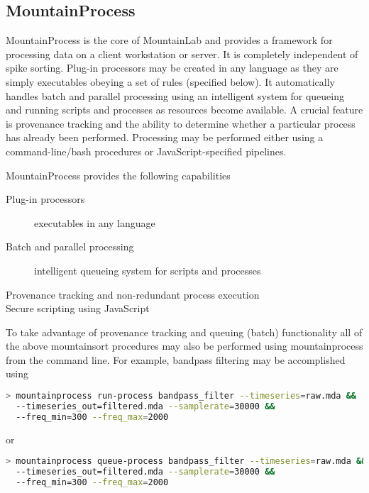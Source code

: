 \documentclass{article}
\begin{document}
\subsection{MountainProcess}

MountainProcess is the core of MountainLab and provides a framework for processing data on a client workstation or server. It is completely independent of spike sorting. Plug-in processors may be created in any language as they are simply executables obeying a set of rules (specified below). It automatically handles batch and parallel processing using an intelligent system for queueing and running scripts and processes as resources become available. A crucial feature is provenance tracking and the ability to determine whether a particular process has already been performed. Processing may be performed either using a command-line/bash procedures or JavaScript-specified pipelines.

MountainProcess provides the following capabilities
\begin{description}
\item[Plug-in processors] executables in any language
\item[Batch and parallel processing] intelligent queueing system for scripts and processes
\item[Provenance tracking and non-redundant process execution]
\item[Secure scripting using JavaScript]
\end{description}

To take advantage of provenance tracking and queuing (batch) functionality all of the above mountainsort procedures may also be performed using mountainprocess from the command line. For example, bandpass filtering may be accomplished using
\begin{lstlisting}[language=bash]
> mountainprocess run-process bandpass_filter --timeseries=raw.mda &&
  --timeseries_out=filtered.mda --samplerate=30000 &&
  --freq_min=300 --freq_max=2000
\end{lstlisting}
or
\begin{lstlisting}[language=bash]
> mountainprocess queue-process bandpass_filter --timeseries=raw.mda &&
  --timeseries_out=filtered.mda --samplerate=30000 &&
  --freq_min=300 --freq_max=2000
\end{lstlisting}
\end{document}
